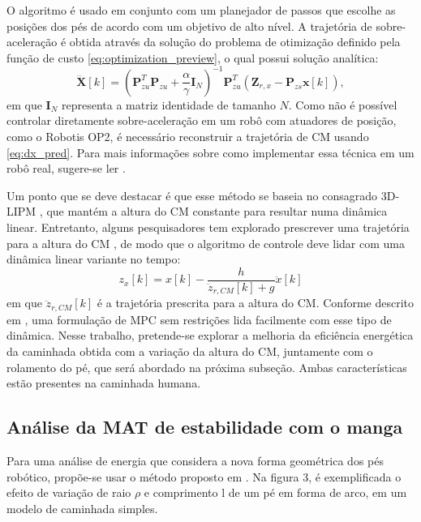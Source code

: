 O algoritmo é usado em conjunto com um planejador de passos que escolhe as posições dos pés de acordo com um objetivo de alto nível. A trajetória de sobre-aceleração é obtida através da solução do problema de otimização definido pela função de custo \eqref{eq:optimization_preview}, o qual possui solução analítica:
\begin{equation}
\dddot{\mathrm{\mathbf{X}}}[k] = \left( \mathrm{\mathbf{P}}^T_{zu} \mathrm{\mathbf{P}}_{zu} + \frac{\alpha}{\gamma} \mathrm{\mathbf{I}}_N \right)^{-1} \mathrm{\mathbf{P}}^T_{zu} \left( \mathrm{\mathbf{Z}}_{r,x} - \mathrm{\mathbf{P}}_{zs} \mathrm{\mathbf{x}}[k] \right),
\end{equation}
em que \( \mathrm{\mathbf{I}}_N \) representa a matriz identidade de tamanho \( N \). Como não é possível controlar diretamente sobre-aceleração em um robô com atuadores de posição, como o Robotis OP2, é necessário reconstruir a trajetória de CM usando \eqref{eq:dx_pred}. Para mais informações sobre como implementar essa técnica em um robô real, sugere-se ler \cite{tesemarcos}.

Um ponto que se deve destacar é que esse método se baseia no consagrado 3D-LIPM \cite{kajita2001}, que mantém a altura do CM constante para resultar numa dinâmica linear. Entretanto, alguns pesquisadores tem explorado prescrever uma trajetória para a altura do CM \cite{herdt2013}, de modo que o algoritmo de controle deve lidar com uma dinâmica linear variante no tempo:
\begin{equation}
z_x\left[ k \right] = x \left[ k \right] - \frac{h}{\ddot{z}_{r,CM}\left[ k \right] + g} \ddot{x} \left[ k \right]
\end{equation}
em que \( \ddot{z}_{r,CM}[k] \) é a trajetória prescrita para a altura do CM. Conforme descrito em \cite{herdt2013}, uma formulação de MPC sem restrições lida facilmente com esse tipo de dinâmica. Nesse trabalho, pretende-se explorar a melhoria da eficiência energética da caminhada obtida com a variação da altura do CM, juntamente com o rolamento do pé, que será abordado na próxima subseção. Ambas características estão presentes na caminhada humana.

\subsection{Análise da MAT de estabilidade com o manga}

Para uma análise de energia que considera a nova forma geométrica dos pés robótico, propõe-se usar o método proposto em  \cite{adamczyk2013}. Na figura 3, é exemplificada o efeito de variação de raio $\rho$ e comprimento l de um pé em forma de  arco, em um modelo de caminhada simples. 

